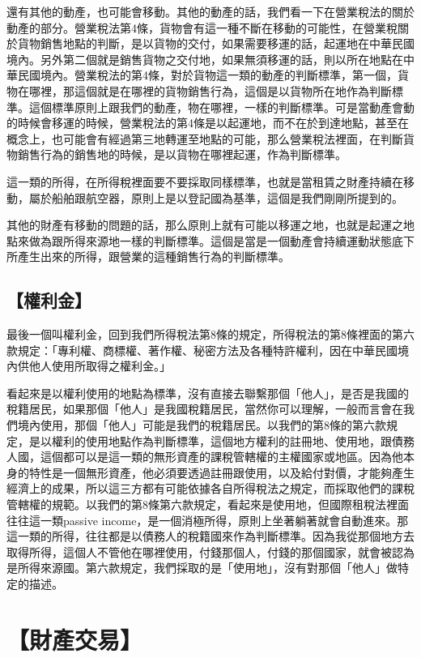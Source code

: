 \documentclass[]{ctexbook}
\begin{document}
還有其他的動產，也可能會移動。其他的動產的話，我們看一下在營業稅法的關於動產的部分。營業稅法第4條，貨物會有這一種不斷在移動的可能性，在營業稅關於貨物銷售地點的判斷，是以貨物的交付，如果需要移運的話，起運地在中華民國境內。另外第二個就是銷售貨物之交付地，如果無須移運的話，則以所在地點在中華民國境內。營業稅法的第4條，對於貨物這一類的動產的判斷標準，第一個，貨物在哪裡，那這個就是在哪裡的貨物銷售行為，這個是以貨物所在地作為判斷標準。這個標準原則上跟我們的動產，物在哪裡，一樣的判斷標準。可是當動產會動的時候會移運的時候，營業稅法的第4條是以起運地，而不在於到達地點，甚至在概念上，也可能會有經過第三地轉運至地點的可能，那么營業稅法裡面，在判斷貨物銷售行為的銷售地的時候，是以貨物在哪裡起運，作為判斷標準。

這一類的所得，在所得稅裡面要不要採取同樣標準，也就是當租賃之財產持續在移動，屬於船舶跟航空器，原則上是以登記國為基準，這個是我們剛剛所提到的。

其他的財產有移動的問題的話，那么原則上就有可能以移運之地，也就是起運之地點來做為跟所得來源地一樣的判斷標準。這個是當是一個動產會持續運動狀態底下所產生出來的所得，跟營業的這種銷售行為的判斷標準。

\hypertarget{ux6b0aux5229ux91d1}{%
\subsection{【權利金】}\label{ux6b0aux5229ux91d1}}

最後一個叫權利金，回到我們所得稅法第8條的規定，所得稅法的第8條裡面的第六款規定：「專利權、商標權、著作權、秘密方法及各種特許權利，因在中華民國境內供他人使用所取得之權利金。」

看起來是以權利使用的地點為標準，沒有直接去聯繫那個「他人」，是否是我國的稅籍居民，如果那個「他人」是我國稅籍居民，當然你可以理解，一般而言會在我們境內使用，那個「他人」可能是我們的稅籍居民。以我們的第8條的第六款規定，是以權利的使用地點作為判斷標準，這個地方權利的註冊地、使用地，跟債務人國，這個都可以是這一類的無形資產的課稅管轄權的主權國家或地區。因為他本身的特性是一個無形資產，他必須要透過註冊跟使用，以及給付對價，才能夠產生經濟上的成果，所以這三方都有可能依據各自所得稅法之規定，而採取他們的課稅管轄權的規範。以我們的第8條第六款規定，看起來是使用地，但國際租稅法裡面往往這一類passive income，是一個消極所得，原則上坐著躺著就會自動進來。那這一類的所得，往往都是以債務人的稅籍國來作為判斷標準。因為我從那個地方去取得所得，這個人不管他在哪裡使用，付錢那個人，付錢的那個國家，就會被認為是所得來源國。第六款規定，我們採取的是「使用地」，沒有對那個「他人」做特定的描述。

\hypertarget{ux8ca1ux7522ux4ea4ux6613}{%
\section{【財產交易】}\label{ux8ca1ux7522ux4ea4ux6613}}
\end{document}
